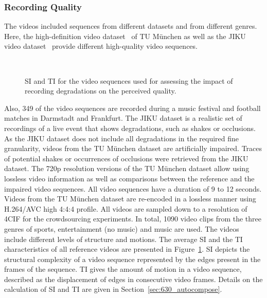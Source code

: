\subsubsection{Recording Quality}
The videos included sequences from different datasets and from different genres. 
Here, the high-definition video dataset~\cite{Keimel2010} of TU M\"unchen as well as the JIKU video dataset~\cite{Saini2013} provide different high-quality video sequences. 
\begin{figure}[htb]
	\centering
	\\	
	\caption[SI and TI for the recording degradation video dataset.]{SI and TI for the video sequences used for assessing the impact of recording degradations on the perceived quality.}
	\label{fig:420_siti_plot}
\end{figure}
Also, 349 of the video sequences are recorded during a music festival and football matches in Darmstadt and Frankfurt. 
The JIKU dataset is a realistic set of recordings of a live event that shows degradations, such as shakes or occlusions. 
As the JIKU dataset does not include all degradations in the required fine granularity, videos from the TU M\"unchen dataset are artificially impaired. 
Traces of potential shakes or occurrences of occlusions were retrieved from the JIKU dataset.
The \ac{720p} resolution versions of the TU M\"unchen dataset allow using lossless video information as well as comparisons between the reference and the impaired video sequences. 
All video sequences have a duration of 9 to 12 seconds.
Videos from the TU M\"unchen dataset are re-encoded in a lossless manner using H.264/\ac{AVC} high 4:4:4 profile. 
All videos are sampled down to a resolution of \ac{4CIF} for the crowdsourcing experiments. 
In total, 1090 video clips from the three genres of sports, entertainment (no music) and music are used.
The videos include different levels of structure and motions. 
The average \ac{SI} and the \ac{TI}~\cite{ITU-J2008} characteristics of all reference videos are presented in Figure~\ref{fig:420_siti_plot}.
\ac{SI} depicts the structural complexity of a video sequence represented by the edges present in the frames of the sequence.
\ac{TI} gives the amount of motion in a video sequence, described as the displacement of edges in consecutive video frames.
Details on the calculation of \ac{SI} and \ac{TI} are given in Section~\ref{sec:630_autocompose}. 
